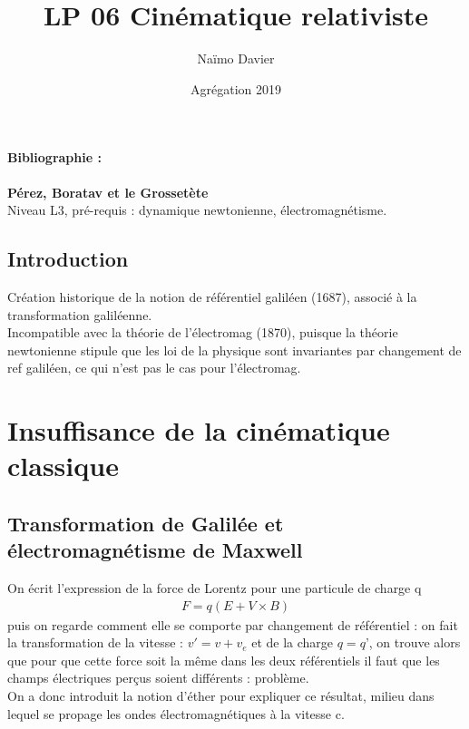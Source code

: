 \documentclass[12pt,prb,aps,epsf]{article}
\begin{document}
	
	\title{LP 06 Cinématique relativiste}
	\author{Naïmo Davier}
	\date{Agrégation 2019}
	
	\maketitle
	
	\tableofcontents
	
	\pagebreak
	
\paragraph{Bibliographie :} 
\textbf{Pérez, Boratav et le Grossetète}\\

Niveau L3, pré-requis : dynamique newtonienne, électromagnétisme.
	
\subsection{Introduction}
Création historique de la notion de référentiel galiléen (1687), associé à la transformation galiléenne.\\
Incompatible avec la théorie de l'électromag (1870), puisque la théorie newtonienne stipule que les loi de la physique sont invariantes par changement de ref galiléen, ce qui n'est pas le cas pour l'électromag.

\section{Insuffisance de la cinématique classique}
\subsection{Transformation de Galilée et électromagnétisme de Maxwell}

On écrit l'expression de la force de Lorentz pour une particule de charge q 
\begin{eqnarray}
F = q(E+V\times B)
\end{eqnarray}
 puis on regarde comment elle se comporte par changement de référentiel : on fait la transformation de la vitesse : $v' = v+v_e$ et de la charge $q=q$', on trouve alors que pour que cette force soit la même dans les deux référentiels il faut que les champs électriques perçus soient différents : problème.\\
 On a donc introduit la notion d'éther pour expliquer ce résultat, milieu dans lequel se propage les ondes électromagnétiques à la vitesse c.
 
\end{document}
